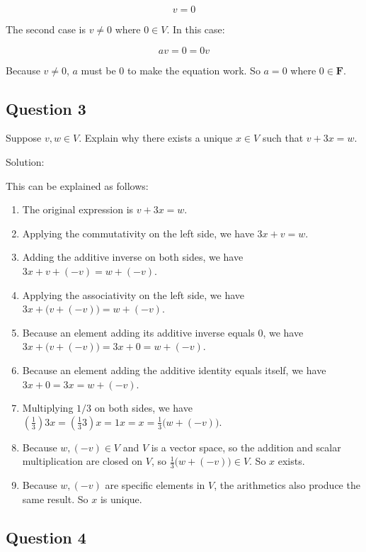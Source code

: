 \documentclass[12pt, letterpaper, oneside]{book}
\begin{document}
\[ v = 0 \]

The second case is $v \neq 0$ where $0 \in V$. In this case:

\[ av = 0 = 0v \]

Because $v \neq 0$, $a$ must be $0$ to make the equation work. So $a = 0$ where
$0 \in \mathbf{F}$.

\subsection{Question 3}

Suppose $v, w \in V$. Explain why there exists a unique $x \in V$ such that
$v + 3x = w$.

Solution:

This can be explained as follows:

\begin{enumerate}
  \item The original expression is $v + 3x = w$.
  \item Applying the commutativity on the left side, we have $3x + v = w$.
  \item Adding the additive inverse on both sides, we have $3x + v + (-v) =
    w + (-v)$.
  \item Applying the associativity on the left side, we have $3x + \bigl(v +
    (-v)\bigr) = w + (-v)$.
  \item Because an element adding its additive inverse equals $0$, we have
    $3x + \bigl(v + (-v)\bigr) = 3x + 0 = w + (-v)$.
  \item Because an element adding the additive identity equals itself, we have
    $3x + 0 = 3x = w + (-v)$.
  \item Multiplying $1/3$ on both sides, we have $(\frac{1}{3})3x =
    (\frac{1}{3}3)x = 1x = x = \frac{1}{3}\bigl(w + (-v)\bigr)$.
  \item Because $w, (-v) \in V$ and $V$ is a vector space, so the addition and
    scalar multiplication are closed on $V$, so $\frac{1}{3}\bigl(w +
    (-v)\bigr) \in V$. So $x$ exists.
  \item Because $w, (-v)$ are specific elements in $V$, the arithmetics also
    produce the same result. So $x$ is unique.
\end{enumerate}

\subsection{Question 4}
\end{document}
